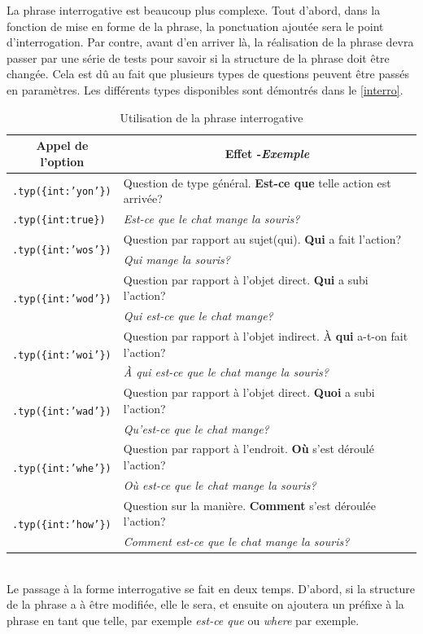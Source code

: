 \documentclass[11pt]{article} %
\newcommand{\real}[1]{\emph{#1}}
\begin{document}
La phrase interrogative est beaucoup plus complexe.
Tout d'abord, dans la fonction de mise en forme de la phrase, la
ponctuation ajoutée sera le point d'interrogation. Par contre, avant
d'en arriver là, la réalisation de la phrase devra passer par une
série de tests pour savoir si la structure de la phrase doit être
changée. Cela est dû au fait que plusieurs types de questions peuvent
être passés en paramètres. Les différents types disponibles sont démontrés 
dans le \autoref{interro}.
\begin{table}[ht]
\caption{Utilisation de la phrase interrogative}
\begin{tabular}{|l|l|}
\hline 
\multicolumn{1}{|c}{Appel de l'option} & \multicolumn{1}{|c|}{Effet -\small{\real{Exemple}}}\\
\hline 
\hline 
\texttt{.typ(\{int:'yon'\})} & Question de type général.\textbf{ Est-ce que} telle action est arrivée? \\
\texttt{.typ(\{int:true\})} & \small{\real{Est-ce que le chat mange la souris?}}\\
\hline
\multirow{2}{*}{\texttt{.typ(\{int:'wos'\})}} & Question par rapport au sujet(qui). \textbf{Qui} a fait l'action?\\
& \small{\real{Qui mange la souris?}}\\ \hline
\multirow{2}{*}{\texttt{.typ(\{int:'wod'\})}} & Question par rapport à l'objet direct. \textbf{Qui} a subi l'action?\\
& \small{\real{Qui est-ce que le chat mange?}}\\
\hline 
\multirow{2}{*}{\texttt{.typ(\{int:'woi'\})}} & Question par rapport à l'objet indirect. À \textbf{qui} a-t-on fait
l'action?\\
&\small{\real{À qui est-ce que le chat mange la souris?}}\\
\hline 
\multirow{2}{*}{\texttt{.typ(\{int:'wad'\})}} & Question par rapport à l'objet direct. \textbf{Quoi} a subi l'action?\\
&\small{\real{Qu'est-ce que le chat mange?}} \\ \hline 
\multirow{2}{*}{\texttt{.typ(\{int:'whe'\})}} & Question par rapport à l'endroit. \textbf{Où }s'est déroulé l'action?\\
& \small{\real{Où est-ce que le chat mange la souris?}} \\ \hline 
\multirow{2}{*}{\texttt{.typ(\{int:'how'\})}} & Question sur la manière. \textbf{Comment }s'est déroulée l'action?\\
& \small{\real{Comment est-ce que le chat mange la souris?}} \\ \hline 
\end{tabular}
\label{interro}
\end{table}
\\
Le passage à la forme interrogative se fait en deux temps. D'abord,
si la structure de la phrase a à être modifiée, elle le sera, et ensuite
on ajoutera un préfixe à la phrase en tant que telle, par exemple
\emph{est-ce que }ou \emph{where} par exemple.
\end{document}
